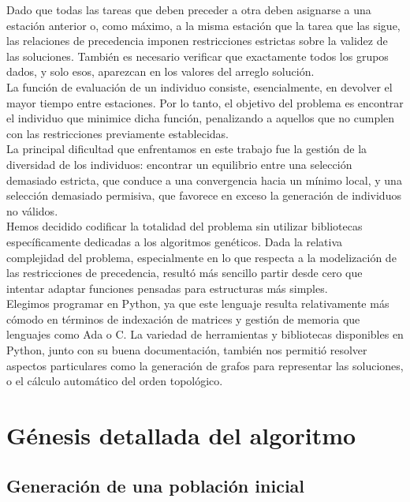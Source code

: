 \documentclass[12pt]{report}
\begin{document}
Dado que todas las tareas que deben preceder a otra deben asignarse a una estación anterior o, como máximo, a la misma estación que la tarea que las sigue, 
las relaciones de precedencia imponen restricciones estrictas sobre la validez de las soluciones. También es necesario verificar que exactamente todos los grupos dados, y solo esos, aparezcan en los valores del arreglo solución.\\

La función de evaluación de un individuo consiste, esencialmente, en devolver el mayor tiempo entre estaciones. Por lo tanto, el objetivo del problema es encontrar el individuo que minimice dicha función, penalizando a aquellos que no cumplen con las restricciones previamente establecidas.\\

La principal dificultad que enfrentamos en este trabajo fue la gestión de la diversidad de los individuos: encontrar un equilibrio entre una selección demasiado estricta, que conduce a una convergencia hacia un mínimo local, y una selección demasiado permisiva, que favorece en exceso la generación de individuos no válidos.\\

Hemos decidido codificar la totalidad del problema sin utilizar bibliotecas específicamente dedicadas a los algoritmos genéticos. Dada la relativa complejidad del problema, especialmente en lo que respecta a la modelización de las restricciones de precedencia, resultó más sencillo partir desde cero que intentar adaptar funciones pensadas para estructuras más simples.\\
Elegimos programar en Python, ya que este lenguaje resulta relativamente más cómodo en términos de indexación de matrices y gestión de memoria que lenguajes como Ada o C. La variedad de herramientas y bibliotecas disponibles en Python, junto con su buena documentación, también nos permitió resolver aspectos particulares como la generación de grafos para representar las soluciones, o el cálculo automático del orden topológico.


\chapter{Génesis detallada del algoritmo}

\section{Generación de una población inicial}
\end{document}
